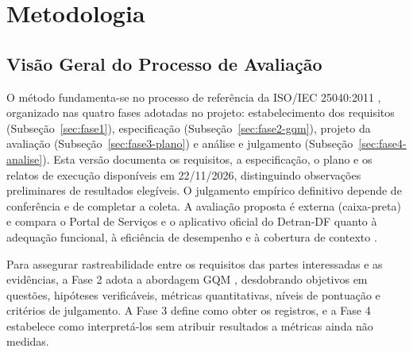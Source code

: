 \section{Metodologia}
\label{sec:metodologia}

\subsection{Visão Geral do Processo de Avaliação}
\label{subsec:visao-geral-metodologia}

O método fundamenta-se no processo de referência da ISO/IEC 25040:2011 \cite{iso25040_2011}, organizado nas quatro fases adotadas no projeto: estabelecimento dos requisitos (Subseção~\ref{sec:fase1}), especificação (Subseção~\ref{sec:fase2-gqm}), projeto da avaliação (Subseção~\ref{sec:fase3-plano}) e análise e julgamento (Subseção~\ref{sec:fase4-analise}). Esta versão documenta os requisitos, a especificação, o plano e os relatos de execução disponíveis em 22/11/2026, distinguindo observações preliminares de resultados elegíveis. O julgamento empírico definitivo depende de conferência e de completar a coleta. A avaliação proposta é externa (caixa-preta) e compara o Portal de Serviços e o aplicativo oficial do Detran-DF quanto à adequação funcional, à eficiência de desempenho e à cobertura de contexto \cite{iso25010_2023,iso25010_2011}.

Para assegurar rastreabilidade entre os requisitos das partes interessadas e as evidências, a Fase 2 adota a abordagem GQM \cite{basili1994gqm}, desdobrando objetivos em questões, hipóteses verificáveis, métricas quantitativas, níveis de pontuação e critérios de julgamento. A Fase 3 define como obter os registros, e a Fase 4 estabelece como interpretá-los sem atribuir resultados a métricas ainda não medidas.
